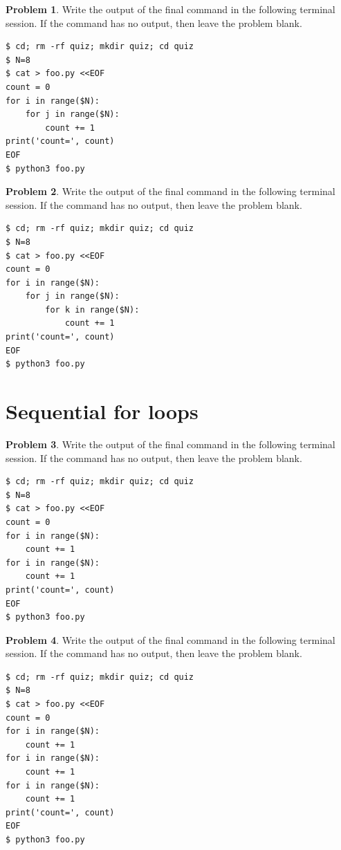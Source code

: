 \documentclass[10pt]{article}
\theoremstyle{definition}
\newtheorem{problem}{Problem}
\begin{document}
\filbreak
\begin{problem}
    Write the output of the final command in the following terminal session.
    If the command has no output, then leave the problem blank.
\end{problem}
\begin{lstlisting}
$ cd; rm -rf quiz; mkdir quiz; cd quiz
$ N=8
$ cat > foo.py <<EOF
count = 0
for i in range($N):
    for j in range($N):
        count += 1
print('count=', count)
EOF
$ python3 foo.py
\end{lstlisting}
\vspace{0.4in}

\filbreak
\begin{problem}
    Write the output of the final command in the following terminal session.
    If the command has no output, then leave the problem blank.
\end{problem}
\begin{lstlisting}
$ cd; rm -rf quiz; mkdir quiz; cd quiz
$ N=8
$ cat > foo.py <<EOF
count = 0
for i in range($N):
    for j in range($N):
        for k in range($N):
            count += 1
print('count=', count)
EOF
$ python3 foo.py
\end{lstlisting}
\vspace{0.1in}

\filbreak
\section{Sequential for loops}

\begin{problem}
    Write the output of the final command in the following terminal session.
    If the command has no output, then leave the problem blank.
\end{problem}
\begin{lstlisting}
$ cd; rm -rf quiz; mkdir quiz; cd quiz
$ N=8
$ cat > foo.py <<EOF
count = 0
for i in range($N):
    count += 1
for i in range($N):
    count += 1
print('count=', count)
EOF
$ python3 foo.py
\end{lstlisting}
\vspace{0.1in}

\filbreak
\begin{problem}
    Write the output of the final command in the following terminal session.
    If the command has no output, then leave the problem blank.
\end{problem}
\begin{lstlisting}
$ cd; rm -rf quiz; mkdir quiz; cd quiz
$ N=8
$ cat > foo.py <<EOF
count = 0
for i in range($N):
    count += 1
for i in range($N):
    count += 1
for i in range($N):
    count += 1
print('count=', count)
EOF
$ python3 foo.py
\end{lstlisting}
\vspace{0.4in}
\end{document}
